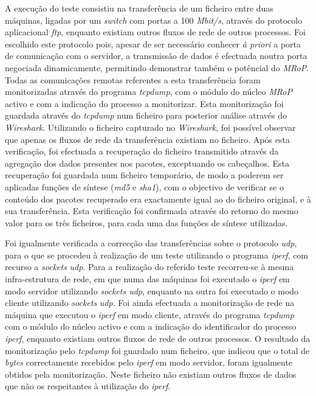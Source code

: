 A execução do teste consistiu na transferência de um ficheiro entre duas máquinas, ligadas por um \textit{switch} com portas a 100 \textit{Mbit/s}, através do protocolo aplicacional \textit{ftp}, enquanto existiam outros fluxos de rede de outros processos.
Foi escolhido este protocolo pois, apesar de ser necessário conhecer \textit{à priori} a porta de comunicação com o servidor, a transmissão de dados é efectuada noutra porta negociada dinamicamente, permitindo demonstrar também o potêncial do \textit{MRoP}.
Todas as comunicações remotas referentes a esta transferência foram monitorizadas através do programa \textit{tcpdump}, com o módulo do núcleo \textit{MRoP} activo e com a indicação do processo a monitorizar.
Esta monitorização foi guardada através do \textit{tcpdump} num ficheiro para posterior análise através do \textit{Wireshark}.
Utilizando o ficheiro capturado no \textit{Wireshark}, foi possível observar que apenas os fluxos de rede da transferência existiam no ficheiro.
Após esta verificação, foi efectuada a recuperação do ficheiro transmitido através da agregação dos dados presentes nos pacotes, exceptuando os cabeçalhos.
Esta recuperação foi guardada num ficheiro temporário, de modo a poderem ser aplicadas funções de síntese (\textit{md5} e \textit{sha1}), com o objectivo de verificar se o conteúdo dos pacotes recuperado era exactamente igual ao do ficheiro original, e à sua transferência.
Esta verificação foi confirmada através do retorno do mesmo valor para os três ficheiros, para cada uma das funções de síntese utilizadas.

Foi igualmente verificada a correcção das transferências sobre o protocolo \textit{udp}, para o que se procedeu à realização de um teste utilizando o programa \textit{iperf}, com recurso a \textit{sockets} \textit{udp}.
Para a realização do referido teste recorreu-se à mesma infra-estrutura de rede, em que numa das máquinas foi executado o \textit{iperf} em modo servidor utilizando \textit{sockets udp}, enquanto na outra foi executado o modo cliente utilizando \textit{sockets} \textit{udp}.
Foi ainda efectuada a monitorização de rede na máquina que executou o \textit{iperf} em modo cliente, através do programa \textit{tcpdump} com o módulo do núcleo activo e com a indicação do identificador do processo \textit{iperf}, enquanto existiam outros fluxos de rede de outros processos.
O resultado da monitorização pelo \textit{tcpdump} foi guardado num ficheiro, que indicou que o total de \textit{bytes} correctamente recebidos pelo \textit{iperf} em modo servidor, foram igualmente obtidos pela monitorização.
Neste ficheiro não existiam outros fluxos de dados que não os respeitantes à utilização do \textit{iperf}.

